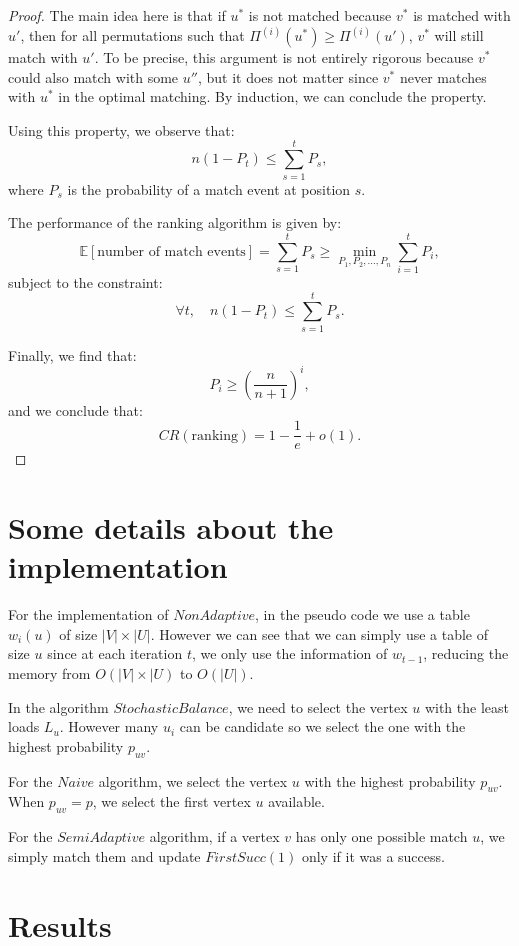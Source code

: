 \documentclass[12pt, twocolumn]{article}
\begin{document}
\begin{proof}
    The main idea here is that if $u^*$ is not matched because $v^*$ is matched with $u'$, then for all permutations such that $\Pi^{(i)}(u^*) \geq \Pi^{(i)}(u')$, $v^*$ will still match with $u'$. To be precise, this argument is not entirely rigorous because $v^*$ could also match with some $u''$, but it does not matter since $v^*$ never matches with $u^*$ in the optimal matching. By induction, we can conclude the property.
    
    Using this property, we observe that:
    \[
        n(1 - P_t) \leq \sum_{s=1}^{t} P_s,
    \]
    where $P_s$ is the probability of a match event at position $s$.
    
    The performance of the ranking algorithm is given by:
    \[
        \mathbb{E}[\text{number of match events}] = \sum_{s=1}^{t} P_s \geq \min_{P_1, P_2, \dots, P_n} \sum_{i=1}^{t} P_i,
    \]
    subject to the constraint:
    \[
        \forall t, \quad n(1 - P_t) \leq \sum_{s=1}^{t} P_s.
    \]
    
    Finally, we find that:
    \[
        P_i \geq \left( \frac{n}{n+1} \right)^i,
    \]
    and we conclude that:
    \[
        CR(\text{ranking}) = 1 - \frac{1}{e} + o(1).
    \]
\end{proof}


\section{Some details about the implementation}
For the implementation of $NonAdaptive$, in the pseudo code we use a table $w_i(u)$ of size $|V|\times |U|$. However we can see that we can simply use a table of size $u$ since at each iteration $t$, we only use the information of $w_{t-1}$, reducing the memory from $O(|V|\times |U)$ to $O(|U|)$.

In the algorithm $StochasticBalance$, we need to select the vertex $u$ with the least loads $L_u$. However many $u_i$ can be candidate so we select the one with the highest probability $p_{uv}$.

For the $Naive$ algorithm, we select the vertex $u$ with the highest probability $p_{uv}$. When $p_{uv}=p$, we select the first vertex $u$ available.

For the $SemiAdaptive$ algorithm, if a vertex $v$ has only one possible match $u$, we simply match them and update $FirstSucc(1)$ only if it was a success.

\newpage
\section{Results}
\end{document}

